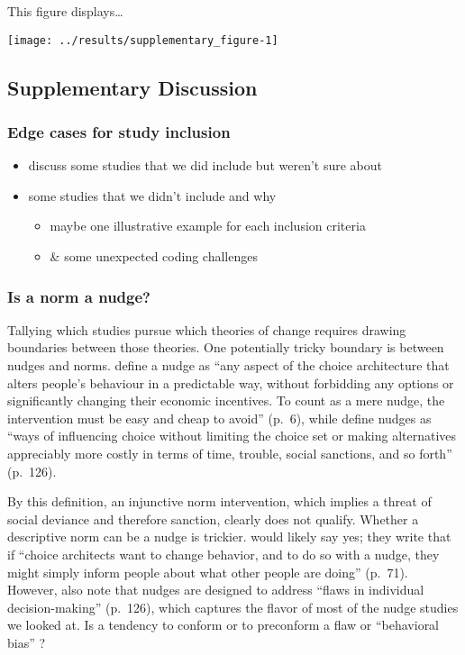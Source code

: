 \documentclass[sn-nature,pdflatex]{sn-jnl}
\begin{document}
This figure displays\ldots{}

\texttt{[image: ../results/supplementary\_figure-1]}

\subsection{Supplementary Discussion}\label{supplementary-discussion}

\subsubsection{Edge cases for study
inclusion}\label{edge-cases-for-study-inclusion}

\begin{itemize}
\item
  discuss some studies that we did include but weren't sure about
\item
  some studies that we didn't include and why

  \begin{itemize}
  \item
    maybe one illustrative example for each inclusion criteria
  \item
    \& some unexpected coding challenges
  \end{itemize}
\end{itemize}

\subsubsection{Is a norm a nudge?}\label{is-a-norm-a-nudge}

Tallying which studies pursue which theories of change requires drawing
boundaries between those theories. One potentially tricky boundary is
between nudges and norms. \citep{thaler2009} define a nudge as ``any
aspect of the choice architecture that alters people's behaviour in a
predictable way, without forbidding any options or significantly
changing their economic incentives. To count as a mere nudge, the
intervention must be easy and cheap to avoid'' (p.~6), while
\citep{hausman2010} define nudges as ``ways of influencing choice
without limiting the choice set or making alternatives appreciably more
costly in terms of time, trouble, social sanctions, and so forth''
(p.~126).

By this definition, an injunctive norm intervention, which implies a
threat of social deviance and therefore sanction, clearly does not
qualify. Whether a descriptive norm can be a nudge is trickier.
\citep{thaler2009} would likely say yes; they write that if ``choice
architects want to change behavior, and to do so with a nudge, they
might simply inform people about what other people are doing'' (p.~71).
However, \citep{hausman2010} also note that nudges are designed to
address ``flaws in individual decision-making'' (p.~126), which captures
the flavor of most of the nudge studies we looked at. Is a tendency to
conform or to preconform \citep{sparkman2017} a flaw or ``behavioral
bias'' \citep[362]{kantorowicz2021}?
\end{document}
